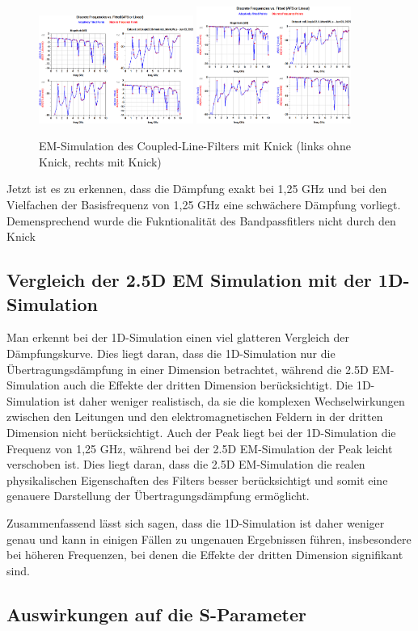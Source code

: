     \begin{figure}[H]
        \centering
        \includegraphics[width=0.45\textwidth]{Pictures/EMSimulationohneKnick.png}
        \includegraphics[width=0.45\textwidth]{Pictures/EMSimulationmitKnick.png}
        \caption{EM-Simulation des Coupled-Line-Filters mit Knick (links ohne Knick, rechts mit Knick)}
    \end{figure}

    Jetzt ist es zu erkennen, dass die Dämpfung exakt bei 1,25 GHz und bei den Vielfachen der Basisfrequenz von 1,25 GHz eine schwächere Dämpfung vorliegt. Demensprechend wurde die Fukntionalität des Bandpassfitlers nicht durch den Knick 


\subsection{Vergleich der 2.5D EM Simulation mit der 1D-Simulation}
Man erkennt bei der 1D-Simulation einen viel glatteren Vergleich der Dämpfungskurve. Dies liegt daran, dass die 1D-Simulation nur die Übertragungsdämpfung in einer Dimension betrachtet, während die 2.5D EM-Simulation auch die Effekte der dritten Dimension berücksichtigt.
Die 1D-Simulation ist daher weniger realistisch, da sie die komplexen Wechselwirkungen zwischen den Leitungen und den elektromagnetischen Feldern in der dritten Dimension nicht berücksichtigt.
Auch der Peak liegt bei der 1D-Simulation die Frequenz von 1,25 GHz, während bei der 2.5D EM-Simulation der Peak leicht verschoben ist. Dies liegt daran, dass die 2.5D EM-Simulation die realen physikalischen Eigenschaften des Filters besser berücksichtigt und somit eine genauere Darstellung der Übertragungsdämpfung ermöglicht.

Zusammenfassend lässt sich sagen, dass die 1D-Simulation ist daher weniger genau und kann in einigen Fällen zu ungenauen Ergebnissen führen, insbesondere bei höheren Frequenzen, bei denen die Effekte der dritten Dimension signifikant sind.

\subsection{Auswirkungen auf die S-Parameter}
